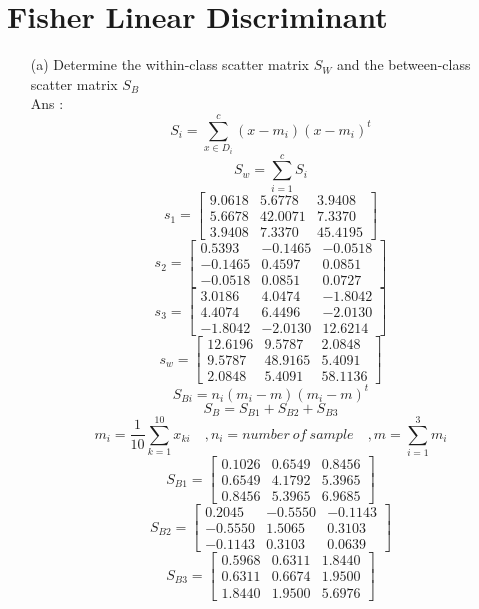 \documentclass[14pt]{report}
\begin{document}
	\section{Fisher Linear Discriminant}
	\begin{enumerate}
		\item [(a)]Determine the within-class scatter matrix $S_W$ and the between-class
		scatter matrix $S_B$ \\
		Ans : \\
		\[S_i=\sum_{x\in D_i}^{c}(x-m_i)(x-m_i)^t \]
		\[S_w=\sum_{i=1}^{c}S_i \]
		\[s_1= \left[\begin{array}{clr}9.0618 & 5.6778 & 3.9408 \\ 5.6678 & 42.0071 & 7.3370 \\ 3.9408 & 7.3370 & 45.4195\end{array} \right] \]
		\[s_2= \left[\begin{array}{clr}0.5393 & -0.1465 & -0.0518 \\ -0.1465 & 0.4597 & 0.0851 \\ -0.0518 & 0.0851 & 0.0727\end{array} \right] \]
		\[s_3= \left[\begin{array}{clr}3.0186 & 4.0474 & -1.8042 \\ 4.4074 & 6.4496 & -2.0130 \\ -1.8042 & -2.0130 & 12.6214\end{array} \right] \]
		\[s_w= \left[\begin{array}{clr}12.6196 & 9.5787 & 2.0848 \\ 9.5787 & 48.9165 & 5.4091 \\ 2.0848 & 5.4091 & 58.1136\end{array} \right] \]
		\[S_{Bi}=n_i(m_i-m)(m_i-m)^t \]
		\[S_B=S_{B1}+S_{B2}+S_{B3} \]
		\[m_i=\frac{1}{10}\sum_{k=1}^{10}x_{ki}\quad, n_i=number\ of \ sample\quad, m=\sum_{i=1}^{3}m_i \]
		\[S_{B1}=\left[\begin{array}{clr}0.1026 & 0.6549 & 0.8456 \\ 0.6549 & 4.1792 & 5.3965 \\ 0.8456 & 5.3965 & 6.9685\end{array} \right] \]
		\[S_{B2}=\left[\begin{array}{clr}0.2045 & -0.5550 & -0.1143 \\ -0.5550 & 1.5065 & 0.3103 \\ -0.1143 & 0.3103 & 0.0639\end{array} \right] \]
		\[S_{B3}=\left[\begin{array}{clr}0.5968 & 0.6311 & 1.8440 \\ 0.6311 & 0.6674 & 1.9500 \\ 1.8440 & 1.9500 & 5.6976\end{array} \right] \]

\end{enumerate}
\end{document}

